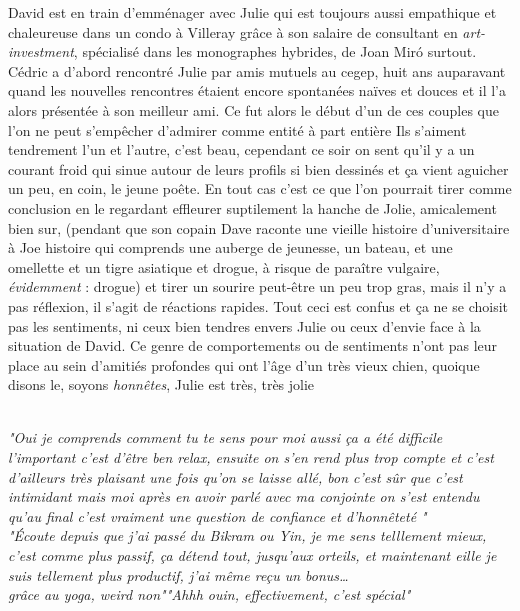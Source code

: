 \begin{paracol}{2}
\begin{rightcolumn} David est en train d'emménager avec Julie qui est
            toujours aussi empathique et chaleureuse dans un condo à Villeray
	    grâce à son salaire de consultant en \textit{art-investment}, 
    spécialisé dans les monographes hybrides, de Joan Mir\'o surtout. Cédric a
    d'abord rencontré Julie par amis mutuels au cegep, huit ans auparavant
    quand les nouvelles rencontres étaient encore spontanées naïves et douces
    et il l'a alors présentée à son meilleur ami. Ce fut alors le début d'un de
    ces couples que l'on ne peut s'empêcher d'admirer comme entité à part entière
    Ils s'aiment tendrement l'un et l'autre, c'est beau, cependant ce soir on sent
    qu'il y a un courant froid qui sinue autour de leurs profils si
    bien dessinés et ça vient aguicher un peu, en coin, le jeune poête. En
    tout cas c'est ce que l'on pourrait tirer comme conclusion en le regardant
    effleurer suptilement la hanche de Jolie, amicalement bien sur, (pendant
    que son copain Dave raconte une vieille histoire d'universitaire à Joe histoire
    qui comprends une auberge de jeunesse, un bateau, et une omellette et un
    tigre asiatique et drogue, à risque de paraître vulgaire, \emph{évidemment}
    : drogue)
    et tirer un sourire peut-être un peu trop gras, mais il
    n'y a pas réflexion, il s'agit de réactions rapides. Tout ceci est
    confus et ça ne se choisit pas les sentiments, ni ceux bien tendres envers
    Julie ou ceux d'envie face à la situation de David. Ce genre de comportements
    ou de sentiments n'ont pas leur place au sein d'amitiés profondes qui ont
    l'âge d'un très vieux chien, quoique disons le,
    soyons \emph{honnêtes}, Julie est très, très jolie \\
\end{rightcolumn}
\begin{leftcolumn} \phantom\\\vspace{5em}
 \phantom{}
\small
            \textit{"Oui je comprends comment tu te sens pour moi aussi ça a été
                difficile l'important c'est d'être ben relax, ensuite on s'en
                rend plus trop compte et c'est d'ailleurs très plaisant une fois
                qu'on se laisse allé, bon c'est sûr que c'est intimidant mais
        moi après en avoir parlé avec ma conjointe on s'est entendu qu'au final
c'est vraiment une question de confiance et d'honnêteté \textelp{}"}\\[10em]
\textit{"Écoute depuis que j'ai passé du Bikram ou Yin, je me sens telllement
	mieux, c'est comme plus passif, ça détend tout, jusqu'aux orteils, et
	maintenant eille je suis tellement plus productif, j'ai même reçu un
	bonus\ldots\\grâce au yoga, weird non""Ahhh ouin, effectivement, c'est
spécial"}
\end{leftcolumn}
\end{paracol}
